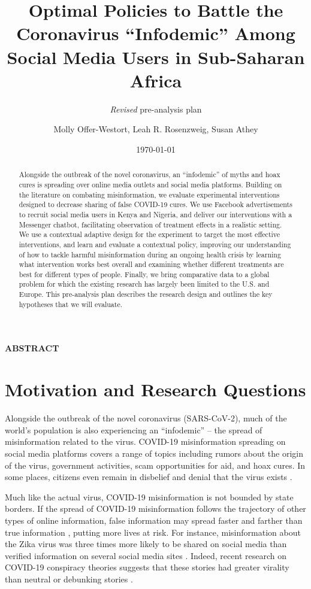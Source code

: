 \documentclass[letterpaper, 12pt, parskip=full,DIV=10]{scrartcl}
\title{Optimal Policies to Battle the Coronavirus ``Infodemic'' Among Social Media Users in Sub-Saharan Africa}
\subtitle{\textit{Revised} pre-analysis plan}
\author{Molly Offer-Westort, Leah R. Rosenzweig, Susan Athey}
\date{\today}
\begin{document}
%
\normalsize%
\maketitle%
\tableofcontents%
\clearpage%


\centerline{\textbf{ABSTRACT}}
\begin{abstract}
Alongside the outbreak of the novel coronavirus, an “infodemic” of myths and hoax cures is spreading over online media outlets and social media platforms. Building on the literature on combating misinformation, we evaluate experimental interventions designed to decrease sharing of false COVID-19 cures. We use Facebook advertisements to recruit social media users in Kenya and Nigeria, and deliver our interventions with a Messenger chatbot, facilitating observation of treatment effects in a realistic setting. We use a contextual adaptive design for the experiment to target the most effective interventions, and learn and evaluate a contextual policy, improving our understanding of how to tackle harmful misinformation during an ongoing health crisis {by learning what intervention works best overall and examining whether different treatments are best for different types of people}. Finally, we bring comparative data to a global problem for which the existing research has largely been limited to the U.S. and Europe. This pre-analysis plan describes the research design and outlines the key hypotheses that we will evaluate.
\end{abstract}





\section{Motivation and Research Questions}

Alongside the outbreak of the novel coronavirus (SARS-CoV-2), much of the world's population is also experiencing an ``infodemic'' -- the spread of misinformation related to the virus. COVID-19 misinformation spreading on social media platforms covers a range of topics including rumors about the origin of the virus, government activities, scam opportunities for aid, and hoax cures. In some places, citizens even remain in disbelief and denial that the virus exists \citep{mwaura2019why-some}. 

Much like the actual virus, COVID-19 misinformation is not bounded by state borders. If the spread of COVID-19 misinformation follows the trajectory of other types of online information, false information may spread faster and farther than true information \citep{vosoughi2018spread}, putting more lives at risk. For instance, misinformation about the Zika virus was three times more likely to be shared on social media than verified information on several social media sites \citep{sharma2017zika}. Indeed, recent research on COVID-19 conspiracy theories suggests that these stories had greater virality than neutral or debunking stories \citep{HKS_whatsapp}. %
 
\end{document}
